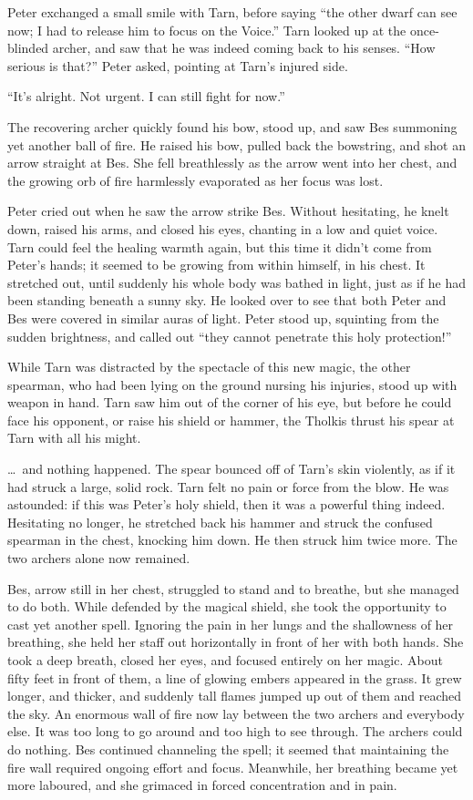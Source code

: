 Peter exchanged a small smile with Tarn, before saying ``the other dwarf can see now; I had to release him to focus on the Voice.''  Tarn looked up at the once-blinded archer, and saw that he was indeed coming back to his senses.  ``How serious is that?'' Peter asked, pointing at Tarn's injured side.

``It's alright.  Not urgent.  I can still fight for now.''

The recovering archer quickly found his bow, stood up, and saw Bes summoning yet another ball of fire.  He raised his bow, pulled back the bowstring, and shot an arrow straight at Bes.  She fell breathlessly as the arrow went into her chest, and the growing orb of fire harmlessly evaporated as her focus was lost.

Peter cried out when he saw the arrow strike Bes.  Without hesitating, he knelt down, raised his arms, and closed his eyes, chanting in a low and quiet voice.  Tarn could feel the healing warmth again, but this time it didn't come from Peter's hands; it seemed to be growing from within himself, in his chest.  It stretched out, until suddenly his whole body was bathed in light, just as if he had been standing beneath a sunny sky.  He looked over to see that both Peter and Bes were covered in similar auras of light.  Peter stood up, squinting from the sudden brightness, and called out ``they cannot penetrate this holy protection!''

While Tarn was distracted by the spectacle of this new magic, the other spearman, who had been lying on the ground nursing his injuries, stood up with weapon in hand.  Tarn saw him out of the corner of his eye, but before he could face his opponent, or raise his shield or hammer, the Tholkis thrust his spear at Tarn with all his might.

\ldots\ and nothing happened.  The spear bounced off of Tarn's skin violently, as if it had struck a large, solid rock.  Tarn felt no pain or force from the blow.  He was astounded: if this was Peter's holy shield, then it was a powerful thing indeed.  Hesitating no longer, he stretched back his hammer and struck the confused spearman in the chest, knocking him down.  He then struck him twice more.  The two archers alone now remained.

Bes, arrow still in her chest, struggled to stand and to breathe, but she managed to do both.  While defended by the magical shield, she took the opportunity to cast yet another spell.  Ignoring the pain in her lungs and the shallowness of her breathing, she held her staff out horizontally in front of her with both hands.  She took a deep breath, closed her eyes, and focused entirely on her magic.  About fifty feet in front of them, a line of glowing embers appeared in the grass.  It grew longer, and thicker, and suddenly tall flames jumped up out of them and reached the sky.  An enormous wall of fire now lay between the two archers and everybody else.  It was too long to go around and too high to see through.  The archers could do nothing.  Bes continued channeling the spell; it seemed that maintaining the fire wall required ongoing effort and focus.  Meanwhile, her breathing became yet more laboured, and she grimaced in forced concentration and in pain.

